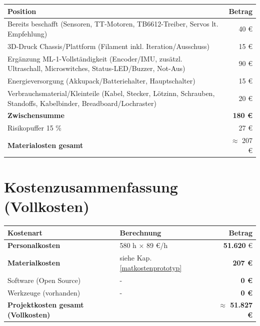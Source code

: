 \documentclass[
  a4paper,
  12pt,
  DIV=12,        %
  parskip=half,  %
  headings=small %
]{scrartcl}
\theoremstyle{definition}
\theoremstyle{definition}
\begin{document}
\begin{tabularx}{\textwidth}{X@{}r}
\toprule
\textbf{Position} & \textbf{Betrag} \\
\midrule
Bereits beschafft (Sensoren, TT-Motoren, TB6612-Treiber, Servos lt. Empfehlung) & 40 \euro \\
3D-Druck Chassis/Plattform (Filament inkl. Iteration/Ausschuss) & 15  \euro \\
Ergänzung ML-1-Vollständigkeit (Encoder/IMU, zusätzl. Ultraschall, Microswitches, Status-LED/Buzzer, Not-Aus) & 90  \euro \\
Energieversorgung (Akkupack/Batteriehalter, Hauptschalter) & 15  \euro \\
Verbrauchsmaterial/Kleinteile (Kabel, Stecker, Lötzinn, Schrauben, Standoffs, Kabelbinder, Breadboard/Lochraster) & 20  \euro \\
\textbf{Zwischensumme} & \textbf{180 \euro} \\
Risikopuffer 15 \% & 27 \euro \\
\textbf{Materialosten gesamt} & $\approx$ 207 \euro \\
\bottomrule
\end{tabularx}



\section{Kostenzusammenfassung (Vollkosten)}

\begin{tabularx}{\textwidth}{X@{}lr}
\toprule
\textbf{Kostenart} & \textbf{Berechnung} & \textbf{Betrag} \\ 
\midrule
\textbf{Personalkosten} & 580 h × 89 €/h & \textbf{51.620} \euro \\
\textbf{Materialkosten} & siehe Kap. \ref{matkostenprototyp} & \textbf{207 \euro} \\
Software (Open Source) & - & \textbf{0 €} \\
Werkzeuge (vorhanden) & - & \textbf{0 €} \\
\textbf{Projektkosten gesamt (Vollkosten)} & & \textbf{$\approx$ 51.827 \euro} \\
\bottomrule
\end{tabularx}




%
%




\end{document}
